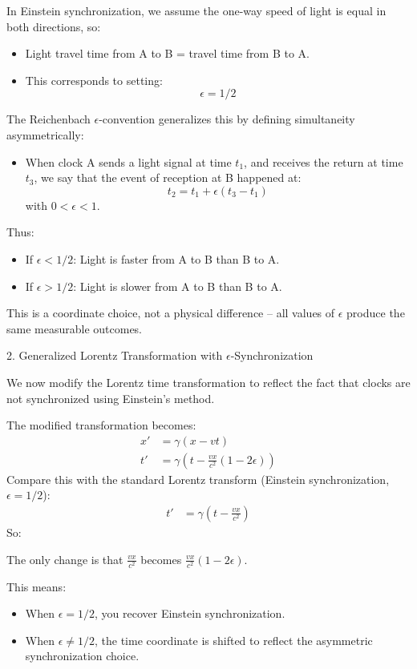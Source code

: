 \documentclass[a4paper]{article}
\theoremstyle{plain}
\theoremstyle{definition}
\begin{document}
In Einstein synchronization, we assume the one-way speed of light is
equal in both directions, so:
\begin{itemize}
\item Light travel time from A to B = travel time from B to A.
\item This corresponds to setting:
  \begin{equation}
    \epsilon = 1/2
  \end{equation}
\end{itemize}
The Reichenbach $\epsilon$-convention generalizes this by defining
simultaneity asymmetrically:
\begin{itemize}
\item When clock A sends a light signal at time $t_1$, and receives
  the return at time $t_3$, we say that the event of reception at B
  happened at:
  \begin{equation}
    t_2 = t_1 + \epsilon (t_3 - t_1)
  \end{equation}
  with $0 < \epsilon < 1$.
\end{itemize}
Thus:
\begin{itemize}
\item If $\epsilon < 1/2$: Light is faster from A to B than B to A.
\item If $\epsilon > 1/2$: Light is slower from A to B than B to A.
\end{itemize}
This is a coordinate choice, not a physical difference -- all values
of $\epsilon$ produce the same measurable outcomes.

2. Generalized Lorentz Transformation with $\epsilon$-Synchronization

We now modify the Lorentz time transformation to reflect the fact that
clocks are not synchronized using Einstein's method.

The modified transformation becomes:
\begin{align*}
  x' & = \gamma (x - vt) \\
  t' & = \gamma (t - \frac{vx}{c^2} (1 - 2 \epsilon))
\end{align*}
Compare this with the standard Lorentz transform (Einstein
synchronization, $\epsilon = 1/2$):
\begin{align*}
  t' & = \gamma (t - \frac{vx}{c^2})
\end{align*}
So:

The only change is that $\frac{vx}{c^2}$ becomes
$\frac{vx}{c^2}(1-2\epsilon)$.

This means:
\begin{itemize}
\item When $\epsilon = 1/2$, you recover Einstein synchronization.
\item When $\epsilon \neq 1/2$, the time coordinate is shifted to
  reflect the asymmetric synchronization choice.
\end{itemize}
\end{document}
